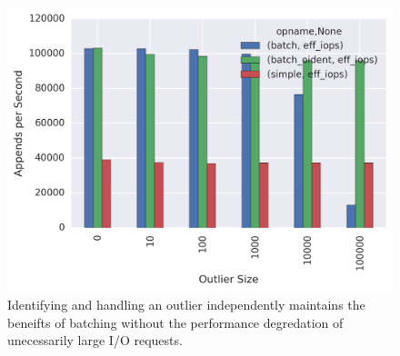 \begin{figure}
\centering
\includegraphics[width=1.0\linewidth]{batching-outlier-detect.png}
\caption{Identifying and handling an outlier independently maintains the
beneifts of batching without the performance degredation of unecessarily
large I/O requests.}
\label{fig:batching-outlier}
\end{figure}
